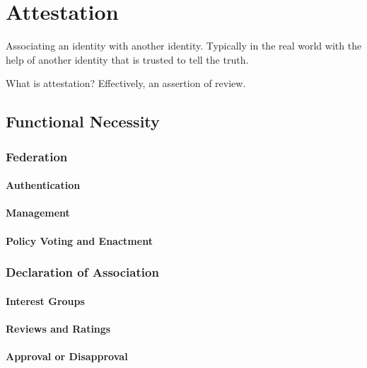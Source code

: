 \chapter{Attestation}

Associating an identity with another identity. Typically in the real world
with the help of another identity that is trusted to tell the truth.

What is attestation? Effectively, an assertion of review.

\section{Functional Necessity}

\subsection{Federation}

\subsubsection{Authentication}

\subsubsection{Management}

\subsubsection{Policy Voting and Enactment}

\subsection{Declaration of Association}

\subsubsection{Interest Groups}

\subsubsection{Reviews and Ratings}

\subsubsection{Approval or Disapproval}

